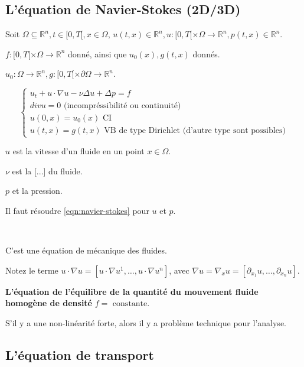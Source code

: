 \documentclass[french]{article}
\theoremstyle{definition}
\begin{document}
\subsection{L'équation de Navier-Stokes (2D/3D)}

Soit \(\Omega \subseteq \mathbb{R}^n, t \in [0,T[, x \in \Omega\), \(u(t,x) \in \mathbb{R}^n, u : [0,T[ \times \Omega \longrightarrow \mathbb{R}^n, p(t,x)\in \mathbb{R}^n\).

\(f : [0,T[ \times \Omega \longrightarrow \mathbb{R}^n\) donné, ainsi que \(u_0(x), g(t,x)\) donnés.

\(u_0 : \Omega \longrightarrow \mathbb{R}^n, g : [0,T[ \times \partial \Omega \longrightarrow \mathbb{R}^n\).


\begin{equation}\label{eqn:navier-stokes}
   \begin{cases}
     u_t + u \cdot \nabla u - \nu \Delta u + \Delta p = f \\
     div u = 0 \text{ (incompréssibilité ou continuité) } \\
     u(0,x) = u_0(x) \text{ CI} \\
     u(t,x) = g(t,x) \text{ VB de type Dirichlet (d'autre type sont possibles)}
   \end{cases}\tag{N.S.}
 \end{equation}


 \(u\) est la vitesse d'un fluide en un point \(x \in \Omega\).

 \(\nu\) est la [...] du fluide.

 \(p\) et la pression.

 Il faut résoudre \ref{eqn:navier-stokes} pour \(u\) et \(p\).

 \

 C'est une équation de mécanique des fluides.

 Notez le terme \(u \cdot \nabla u = [u \cdot \nabla u ^{1}, \dots, u \cdot \nabla u ^{n}]\), avec \(\nabla u = \nabla_x u = [\partial _{x_1}u, \dots, \partial _{x_n}u]\).

 \textbf{L'équation de l'équilibre de la quantité du mouvement fluide homogène de densité} \(f = \text{ constante.}\)

S'il y a une non-linéarité forte, alors il y a problème technique pour l'analyse.

\subsection{L'équation de transport}
\end{document}
